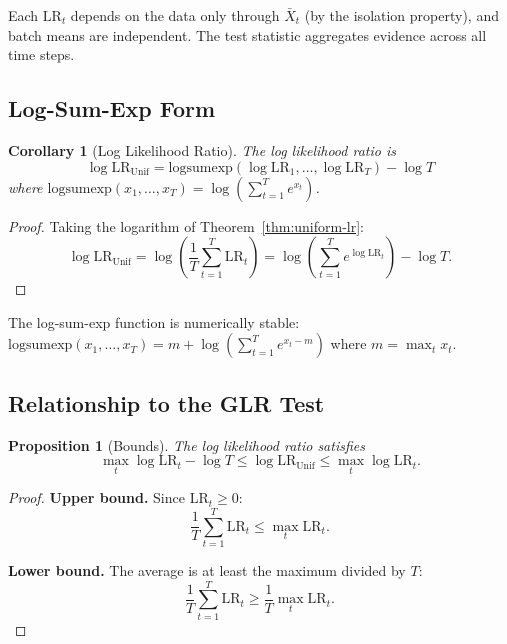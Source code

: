\documentclass{article}
\theoremstyle{plain}
\newtheorem{proposition}[theorem]{Proposition}
\newtheorem{corollary}[theorem]{Corollary}
\theoremstyle{definition}
\theoremstyle{remark}
\renewcommand{\leq}{\leqslant}
\renewcommand{\geq}{\geqslant}
\begin{document}
Each $\mathrm{LR}_t$ depends on the data only through $\bar{X}_t$ (by the isolation property), and batch means are independent. The test statistic aggregates evidence across all time steps.

\subsection{Log-Sum-Exp Form}
\label{app:logsumexp-form}

\begin{corollary}[Log Likelihood Ratio]
    \label{cor:uniform-log-lr}
    The log likelihood ratio is
    \begin{equation*}
        \log \mathrm{LR}_{\mathrm{Unif}} = \mathrm{logsumexp}(\log \mathrm{LR}_1, \ldots, \log \mathrm{LR}_T) - \log T
    \end{equation*}
    where $\mathrm{logsumexp}(x_1, \ldots, x_T) = \log\left(\sum_{t=1}^T e^{x_t}\right)$.
\end{corollary}

\begin{proof}
    Taking the logarithm of Theorem~\ref{thm:uniform-lr}:
    \begin{equation*}
        \log \mathrm{LR}_{\mathrm{Unif}} = \log\left(\frac{1}{T} \sum_{t=1}^{T} \mathrm{LR}_t\right) = \log\left(\sum_{t=1}^{T} e^{\log \mathrm{LR}_t}\right) - \log T.
    \end{equation*}
\end{proof}

The log-sum-exp function is numerically stable: $\mathrm{logsumexp}(x_1, \ldots, x_T) = m + \log\left(\sum_{t=1}^T e^{x_t - m}\right)$ where $m = \max_t x_t$.

\subsection{Relationship to the GLR Test}
\label{app:uniform-vs-glr}

\begin{proposition}[Bounds]
    \label{prop:uniform-bounds}
    The log likelihood ratio satisfies
    \begin{equation*}
        \max_{t} \log \mathrm{LR}_t - \log T \leq \log \mathrm{LR}_{\mathrm{Unif}} \leq \max_{t} \log \mathrm{LR}_t.
    \end{equation*}
\end{proposition}

\begin{proof}
    \textbf{Upper bound.} Since $\mathrm{LR}_t \geq 0$:
    \begin{equation*}
        \frac{1}{T} \sum_{t=1}^{T} \mathrm{LR}_t \leq \max_t \mathrm{LR}_t.
    \end{equation*}

    \textbf{Lower bound.} The average is at least the maximum divided by $T$:
    \begin{equation*}
        \frac{1}{T} \sum_{t=1}^{T} \mathrm{LR}_t \geq \frac{1}{T} \max_t \mathrm{LR}_t.
    \end{equation*}
\end{proof}
\end{document}
